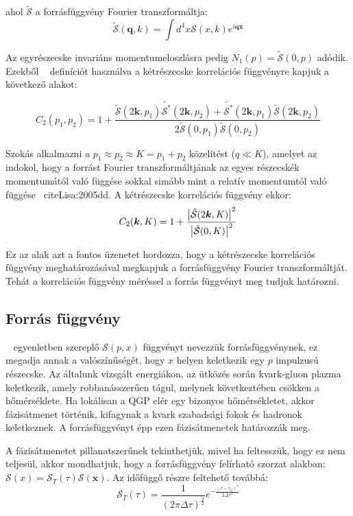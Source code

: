 \documentclass[10pt,a4paper]{article}
\numberwithin{equation}{subsection}
\numberwithin{figure}{section}
\begin{document}
ahol $\tilde{\mathcal{S}}$ a forrásfüggvény Fourier transzformáltja:
\begin{equation}
\tilde{\mathcal{S}}(\bm{q}, {k})=\int d^4x\mathcal{S}(x,k)e^{i\bm{qx}}
\end{equation}

Az egyrészecske invariáns momentumeloszlásra pedig $N_1({p})=\tilde{\mathcal{S}}(0, {p})$ adódik. Ezekből ~ definíciót használva a kétrészecske korrelációs függvényre kapjuk a következő alakot:

\begin{equation}
C_2({p_1},{p_2}) = 1+ \frac{\tilde{\mathcal{S}}(2\bm{k}, {p_1})\tilde{\mathcal{S^*}}(2\bm{k}, {p_2})+\tilde{\mathcal{S^*}}(2\bm{k},{ p_1})\tilde{\mathcal{S}}(2\bm{k}, {p_2})}{2\tilde{\mathcal{S}}(0, {p_1})\tilde{\mathcal{S}}(0, {p_2})}
\end{equation}

Szokás alkalmazni a ${p_1}\approx {p_2}\approx {K} = p_1+p_2$ közelítést ($q\ll K$), amelyet az indokol, hogy a  forrást Fourier transzformáltjának az egyes részecskék momentumától való függése sokkal simább mint a relatív momentumtól való függése ~cite{Lisa:2005dd}. A kétrészecske korrelációs függvény ekkor: 
\begin{equation}
C_2(\bm{k}, {K})=1+\frac{\abs{\tilde{\mathcal{S}}(2\bm{k},{K})}^2}{\abs{\tilde{\mathcal{S}}(0,{K})}^2}
\end{equation}

Ez az alak azt a fontos üzenetet hordozza, hogy a kétrészecske korrelációs függvény meghatározásával megkapjuk a forrásfüggvény Fourier transzformáltját. Tehát a korrelációs függvény méréssel a forrás függvényt meg tudjuk határozni. 


\subsection{Forrás függvény}
~ egyenletben szereplő $\mathcal{S}({p},{x})$ függvényt nevezzük forrásfüggvénynek, ez megadja annak a valószínűségét, hogy ${x}$ helyen keletkezik egy ${p}$ impulzusú részecske. Az általunk vizsgált energiákon, az ütközés során kvark-gluon plazma keletkezik, amely robbanásszerűen tágul, melynek következtében csökken a hőmérséklete. Ha lokálisan a QGP elér egy bizonyos hőmérsékletet, akkor fázisátmenet történik, kifagynak a kvark szabadsági fokok és hadronok keletkeznek. A forrásfüggvényt épp ezen fázisátmenetek határozzák meg. 

A fázisátmenetet pillanatszerűnek tekinthetjük, mivel ha feltesszük, hogy ez nem teljesül, akkor mondhatjuk, hogy a forrásfüggvény felírható szorzat alakban: $\mathcal{S}({x}) = \mathcal{S}_T(\tau)\mathcal{S}(\bm{x})$. Az időfüggő részre feltehető továbbá:
\begin{equation}
\mathcal{S}_T(\tau)=\frac{1}{(2\pi \Delta\tau)^\frac{3}{2}}e^{-\frac{(\tau-\tau_0)^2}{2\Delta\tau^2}}
\end{equation}
\end{document}
